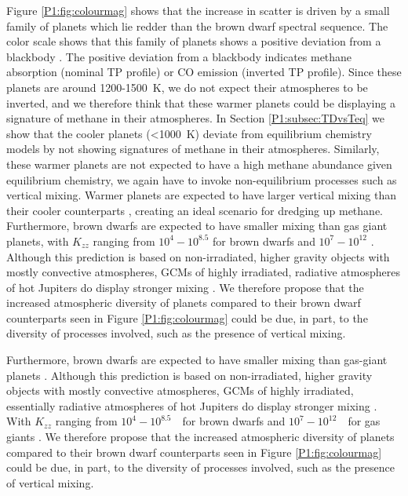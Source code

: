 Figure \ref{P1:fig:colourmag} shows that the increase in scatter is driven by a small family of planets which lie redder than the brown dwarf spectral sequence. The color scale shows that this family of planets shows a positive deviation from a blackbody \citep{Baxter2020}. The positive deviation from a blackbody indicates methane absorption (nominal TP profile) or CO emission (inverted TP profile). Since these planets are around 1200-1500~K, we do not expect their atmospheres to be inverted, and we therefore think that these warmer planets could be displaying a signature of methane in their atmospheres. In Section \ref{P1:subsec:TDvsTeq} we show that the cooler planets (<1000~K) deviate from equilibrium chemistry models by not showing signatures of methane in their atmospheres. Similarly, these warmer planets are not expected to have a high methane abundance given equilibrium chemistry, we again have to invoke non-equilibrium processes such as vertical mixing. Warmer planets are expected to have larger vertical mixing than their cooler counterparts \citep{Komacek2019}, creating an ideal scenario for dredging up methane. Furthermore, brown dwarfs are expected to have smaller mixing than gas giant planets, with $K_{zz}$ ranging from $10^4-10^8.5$ for brown dwarfs and $10^7-10^{12}$ \citep{Zahnle2014, Leggett2017, Miles2020}. Although this prediction is based on non-irradiated, higher gravity objects with mostly convective atmospheres, GCMs of highly irradiated, radiative atmospheres of hot Jupiters do display stronger mixing \citep{Parmentier2013, Komacek2019}. We therefore propose that the increased atmospheric diversity of planets compared to their brown dwarf counterparts seen in Figure \ref{P1:fig:colourmag} could be due, in part, to the diversity of processes involved, such as the presence of vertical mixing.

Furthermore, brown dwarfs are expected to have smaller mixing than gas-giant planets \citep{Zahnle2014}. Although this prediction is based on non-irradiated, higher gravity objects with mostly convective atmospheres, GCMs of highly irradiated, essentially radiative atmospheres of hot Jupiters do display stronger mixing \citep{Parmentier2013, Komacek2019}. With $K_{zz}$ ranging from $10^4-10^{8.5}$~\cmcms~for brown dwarfs \citep{Zahnle2014, Leggett2017, Miles2020} and $10^7-10^{12}$~\cmcms~for gas giants \citep{Parmentier2013, Komacek2019}. We therefore propose that the increased atmospheric diversity of planets compared to their brown dwarf counterparts seen in Figure \ref{P1:fig:colourmag} could be due, in part, to the diversity of processes involved, such as the presence of vertical mixing.

